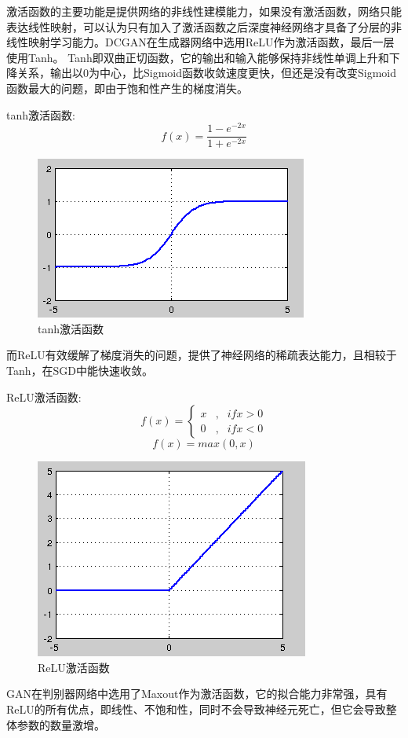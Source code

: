 \documentclass[hyperref, a4paper]{ctexart}
\begin{document}
激活函数的主要功能是提供网络的非线性建模能力，如果没有激活函数，网络只能表达线性映射，可以认为只有加入了激活函数之后深度神经网络才具备了分层的非线性映射学习能力。DCGAN在生成器网络中选用ReLU作为激活函数，最后一层使用Tanh。
Tanh即双曲正切函数，它的输出和输入能够保持非线性单调上升和下降关系，输出以0为中心，比Sigmoid函数收敛速度更快，但还是没有改变Sigmoid函数最大的问题，即由于饱和性产生的梯度消失。

tanh激活函数:\[f(x) = \frac{1-e^{-2x}}{1 + e^{-2x}}\]

\begin{figure}
\centering
\includegraphics{./13.jpg}
\caption{tanh激活函数}
\end{figure}

而ReLU有效缓解了梯度消失的问题，提供了神经网络的稀疏表达能力，且相较于Tanh，在SGD中能快速收敛。

ReLU激活函数: \[ f(x)=\left\{
\begin{aligned}
x & ,& if x>0 \\
0 & , & if x < 0 
\end{aligned}
\right.
\] \[f(x)=max(0,x)\]

\begin{figure}
\centering
\includegraphics{./15.jpg}
\caption{ReLU激活函数}
\end{figure}

GAN在判别器网络中选用了Maxout作为激活函数，它的拟合能力非常强，具有ReLU的所有优点，即线性、不饱和性，同时不会导致神经元死亡，但它会导致整体参数的数量激增。
\end{document}
